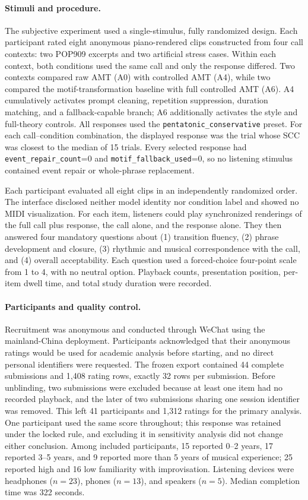 \documentclass[11pt,a4paper]{article}
\begin{document}
\paragraph{Stimuli and procedure.}
The subjective experiment used a single-stimulus, fully randomized design. Each participant rated eight anonymous piano-rendered clips constructed from four call contexts: two POP909 excerpts and two artificial stress cases. Within each context, both conditions used the same call and only the response differed. Two contexts compared raw AMT (A0) with controlled AMT (A4), while two compared the motif-transformation baseline with full controlled AMT (A6). A4 cumulatively activates prompt cleaning, repetition suppression, duration matching, and a fallback-capable branch; A6 additionally activates the style and full-theory controls. All responses used the \texttt{pentatonic\_conservative} preset. For each call--condition combination, the displayed response was the trial whose SCC was closest to the median of 15 trials. Every selected response had \texttt{event\_repair\_count}=0 and \texttt{motif\_fallback\_used}=0, so no listening stimulus contained event repair or whole-phrase replacement.

Each participant evaluated all eight clips in an independently randomized order. The interface disclosed neither model identity nor condition label and showed no MIDI visualization. For each item, listeners could play synchronized renderings of the full call plus response, the call alone, and the response alone. They then answered four mandatory questions about (1) transition fluency, (2) phrase development and closure, (3) rhythmic and musical correspondence with the call, and (4) overall acceptability. Each question used a forced-choice four-point scale from 1 to 4, with no neutral option. Playback counts, presentation position, per-item dwell time, and total study duration were recorded.

\paragraph{Participants and quality control.}
Recruitment was anonymous and conducted through WeChat using the mainland-China deployment. Participants acknowledged that their anonymous ratings would be used for academic analysis before starting, and no direct personal identifiers were requested. The frozen export contained 44 complete submissions and 1,408 rating rows, exactly 32 rows per submission. Before unblinding, two submissions were excluded because at least one item had no recorded playback, and the later of two submissions sharing one session identifier was removed. This left 41 participants and 1,312 ratings for the primary analysis. One participant used the same score throughout; this response was retained under the locked rule, and excluding it in sensitivity analysis did not change either conclusion. Among included participants, 15 reported 0--2 years, 17 reported 3--5 years, and 9 reported more than 5 years of musical experience; 25 reported high and 16 low familiarity with improvisation. Listening devices were headphones ($n=23$), phones ($n=13$), and speakers ($n=5$). Median completion time was 322 seconds.
\end{document}
